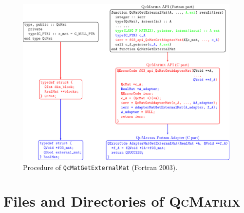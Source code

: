 \documentclass[a4paper,11pt,twoside,openright]{book}
\begin{document}
\begin{figure}[hbtp]
  \centering
  \includegraphics[width=16cm]{F03_QcMatGetExternalMat.pdf}
  \caption{Procedure of \texttt{QcMatGetExternalMat} (Fortran 2003).}
  \label{fig-F03-QcMatGetExternalMat}
\end{figure}

\chapter{Files and Directories of \textsc{QcMatrix}}
\label{chapter-files}
\end{document}
